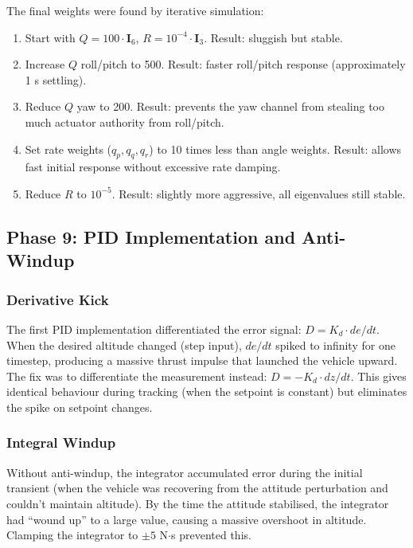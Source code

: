 \documentclass[12pt, a4paper]{article}
\newcommand{\bI}{\bm{I}}
\begin{document}
The final weights were found by iterative simulation:
\begin{enumerate}
    \item Start with $Q = 100 \cdot \bI_6$, $R = 10^{-4} \cdot \bI_3$.  Result: sluggish but stable.
    \item Increase $Q$ roll/pitch to 500.  Result: faster roll/pitch response (approximately 1 s settling).
    \item Reduce $Q$ yaw to 200.  Result: prevents the yaw channel from stealing too much actuator authority from roll/pitch.
    \item Set rate weights ($q_p, q_q, q_r$) to 10 times less than angle weights.  Result: allows fast initial response without excessive rate damping.
    \item Reduce $R$ to $10^{-5}$.  Result: slightly more aggressive, all eigenvalues still stable.
\end{enumerate}

\subsection{Phase 9: PID Implementation and Anti-Windup}

\subsubsection{Derivative Kick}

The first PID implementation differentiated the error signal: $D = K_d \cdot de/dt$.  When the desired altitude changed (step input), $de/dt$ spiked to infinity for one timestep, producing a massive thrust impulse that launched the vehicle upward.  The fix was to differentiate the measurement instead: $D = -K_d \cdot dz/dt$.  This gives identical behaviour during tracking (when the setpoint is constant) but eliminates the spike on setpoint changes.

\subsubsection{Integral Windup}

Without anti-windup, the integrator accumulated error during the initial transient (when the vehicle was recovering from the attitude perturbation and couldn't maintain altitude).  By the time the attitude stabilised, the integrator had ``wound up'' to a large value, causing a massive overshoot in altitude.  Clamping the integrator to $\pm 5$ N$\cdot$s prevented this.
\end{document}
